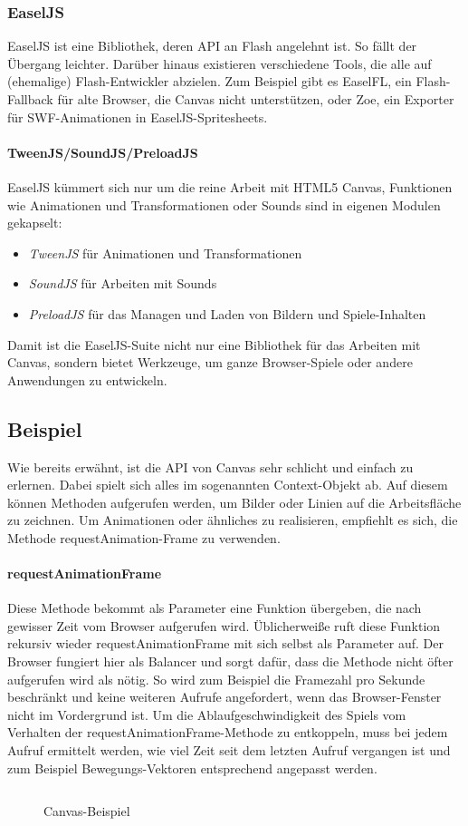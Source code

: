 \documentclass[a4paper, 12pt]{article}
\begin{document}
\subsubsection{EaselJS}
EaselJS ist eine Bibliothek, deren API an Flash angelehnt ist. So fällt der Übergang leichter. Darüber hinaus existieren verschiedene Tools, die alle auf (ehemalige) Flash-Entwickler abzielen. Zum Beispiel gibt es EaselFL, ein Flash-Fallback für alte Browser, die Canvas nicht unterstützen, oder Zoe, ein Exporter für SWF-Animationen in EaselJS-Spritesheets.
\paragraph{TweenJS/SoundJS/PreloadJS} EaselJS kümmert sich nur um die reine Arbeit mit HTML5 Canvas, Funktionen wie Animationen und Transformationen oder Sounds sind in eigenen Modulen gekapselt:
\begin{itemize}
	\item \emph{TweenJS} für Animationen und Transformationen
	\item \emph{SoundJS} für Arbeiten mit Sounds
	\item \emph{PreloadJS} für das Managen und Laden von Bildern und Spiele-Inhalten
\end{itemize}
Damit ist die EaselJS-Suite nicht nur eine Bibliothek für das Arbeiten mit Canvas, sondern bietet Werkzeuge, um ganze Browser-Spiele oder andere Anwendungen zu entwickeln.
\subsection{Beispiel}
Wie bereits erwähnt, ist die API von Canvas sehr schlicht und einfach zu erlernen. Dabei spielt sich alles im sogenannten Context-Objekt ab. Auf diesem können Methoden aufgerufen werden, um Bilder oder Linien auf  die Arbeitsfläche zu zeichnen. Um Animationen oder ähnliches zu realisieren, empfiehlt es sich, die Methode requestAnimation-Frame zu verwenden.
\paragraph{requestAnimationFrame} Diese Methode bekommt als Parameter eine Funktion übergeben, die nach gewisser Zeit vom Browser aufgerufen wird. Üblicherweiße ruft diese Funktion rekursiv wieder requestAnimationFrame mit sich selbst als Parameter auf. Der Browser fungiert hier als Balancer und sorgt dafür, dass die Methode nicht öfter aufgerufen wird als nötig. So wird zum Beispiel die Framezahl pro Sekunde beschränkt und keine weiteren Aufrufe angefordert, wenn das Browser-Fenster nicht im Vordergrund ist. Um die Ablaufgeschwindigkeit des Spiels vom Verhalten der requestAnimationFrame-Methode zu entkoppeln, muss bei jedem Aufruf ermittelt werden, wie viel Zeit seit dem letzten Aufruf vergangen ist und zum Beispiel Bewegungs-Vektoren entsprechend angepasst werden.
\begin{figure}[H]
	\inputminted{javascript}{assets/vanillacanvas_example.js}
	\caption{Canvas-Beispiel}
	\label{canvas_support2}
\end{figure}
\end{document}
